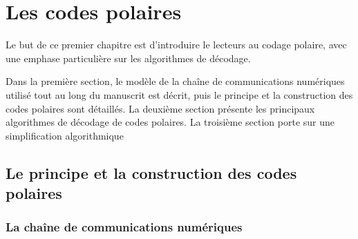 
\chapter{Les codes polaires}
\label{chap:polar_codes}

Le but de ce premier chapitre est d'introduire le lecteurs au codage polaire, avec une emphase particulière sur les algorithmes de décodage.

Dans la première section, le modèle de la chaîne de communications numériques utilisé tout au long du manuscrit est décrit, puis le principe et la construction des codes polaires sont détaillés. La deuxième section présente les principaux algorithmes de décodage de codes polaires. La troisième section porte sur une simplification algorithmique 

\vspace*{\fill}
\minitocTITI
\vspace*{\fill}

\section{Le principe et la construction des codes polaires}

\subsection{La chaîne de communications numériques}
\label{subsec:contexte}


